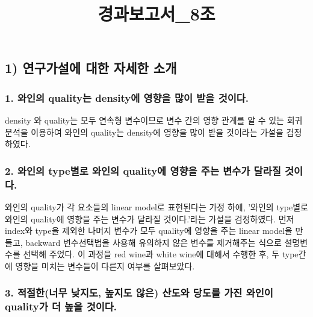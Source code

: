 \documentclass[
]{article}
\title{경과보고서\_8조}
\author{}
\date{\vspace{-2.5em}}
\begin{document}
\maketitle

\hypertarget{uxc5f0uxad6cuxac00uxc124uxc5d0-uxb300uxd55c-uxc790uxc138uxd55c-uxc18cuxac1c}{%
\subsection{1) 연구가설에 대한 자세한
소개}\label{uxc5f0uxad6cuxac00uxc124uxc5d0-uxb300uxd55c-uxc790uxc138uxd55c-uxc18cuxac1c}}

\hypertarget{uxc640uxc778uxc758-qualityuxb294-densityuxc5d0-uxc601uxd5a5uxc744-uxb9ceuxc774-uxbc1buxc744-uxac83uxc774uxb2e4.}{%
\subsubsection{1. 와인의 quality는 density에 영향을 많이 받을
것이다.}\label{uxc640uxc778uxc758-qualityuxb294-densityuxc5d0-uxc601uxd5a5uxc744-uxb9ceuxc774-uxbc1buxc744-uxac83uxc774uxb2e4.}}

density 와 quality는 모두 연속형 변수이므로 변수 간의 영향 관계를 알 수
있는 회귀분석을 이용하여 와인의 quality는 density에 영향을 많이 받을
것이라는 가설을 검정하였다.

\hypertarget{uxc640uxc778uxc758-typeuxbcc4uxb85c-uxc640uxc778uxc758-qualityuxc5d0-uxc601uxd5a5uxc744-uxc8fcuxb294-uxbcc0uxc218uxac00-uxb2ecuxb77cuxc9c8-uxac83uxc774uxb2e4.}{%
\subsubsection{2. 와인의 type별로 와인의 quality에 영향을 주는 변수가
달라질
것이다.}\label{uxc640uxc778uxc758-typeuxbcc4uxb85c-uxc640uxc778uxc758-qualityuxc5d0-uxc601uxd5a5uxc744-uxc8fcuxb294-uxbcc0uxc218uxac00-uxb2ecuxb77cuxc9c8-uxac83uxc774uxb2e4.}}

와인의 quality가 각 요소들의 linear model로 표현된다는 가정 하에,
'와인의 type별로 와인의 quality에 영향을 주는 변수가 달라질 것이다.'라는
가설을 검정하였다. 먼저 index와 type을 제외한 나머지 변수가 모두
quality에 영향을 주는 linear model을 만들고, backward 변수선택법을
사용해 유의하지 않은 변수를 제거해주는 식으로 설명변수를 선택해 주었다.
이 과정을 red wine과 white wine에 대해서 수행한 후, 두 type간에 영향을
미치는 변수들이 다른지 여부를 살펴보았다.

\hypertarget{uxc801uxc808uxd55cuxb108uxbb34-uxb0aeuxc9c0uxb3c4-uxb192uxc9c0uxb3c4-uxc54auxc740-uxc0b0uxb3c4uxc640-uxb2f9uxb3c4uxb97c-uxac00uxc9c4-uxc640uxc778uxc774-qualityuxac00-uxb354-uxb192uxc744-uxac83uxc774uxb2e4.}{%
\subsubsection{3. 적절한(너무 낮지도, 높지도 않은) 산도와 당도를 가진
와인이 quality가 더 높을
것이다.}\label{uxc801uxc808uxd55cuxb108uxbb34-uxb0aeuxc9c0uxb3c4-uxb192uxc9c0uxb3c4-uxc54auxc740-uxc0b0uxb3c4uxc640-uxb2f9uxb3c4uxb97c-uxac00uxc9c4-uxc640uxc778uxc774-qualityuxac00-uxb354-uxb192uxc744-uxac83uxc774uxb2e4.}}
\end{document}
